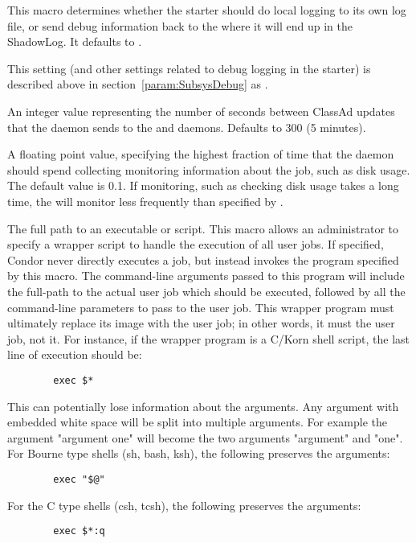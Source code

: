 \begin{description}
\label{param:StarterLocalLogging}
\item[\Macro{STARTER\_LOCAL\_LOGGING}]
  This macro determines whether the
  starter should do local logging to its own log file, or send debug
  information back to the  where it will end up in the
  ShadowLog.  It defaults to .

\label{param:StarterDebug}
\item[\Macro{STARTER\_DEBUG}]
  This setting (and other settings related to debug logging in the starter) is
  described above in section~\ref{param:SubsysDebug} as
  .

\label{param:StarterUpdateInterval}
\item[\Macro{STARTER\_UPDATE\_INTERVAL}]
  An integer value representing the number of seconds between 
  ClassAd updates that the  daemon sends to the 
   and  daemons. 
  Defaults to 300 (5 minutes).

\label{param:StarterUpdateIntervalTimeslice}
\item[\Macro{STARTER\_UPDATE\_INTERVAL\_TIMESLICE}]
  A floating point value, specifying the highest fraction of time that the 
   daemon should spend collecting
  monitoring information about the job, such as disk usage.
  The default  value is 0.1.  
  If monitoring, such as checking disk usage takes a long time,
  the  will monitor less frequently than specified by
  .

\label{param:UserJobWrapper} 
\item[\Macro{USER\_JOB\_WRAPPER}]
  The full path to an executable or script.
  This macro allows an administrator to specify a wrapper script to handle the
  execution of all user jobs.  
  If specified, Condor never directly executes a job, but instead
  invokes the program specified by this macro.
  The command-line arguments passed to this program will include the
  full-path to the actual user job which should be executed, followed by all
  the command-line parameters to pass to the user job.
  This wrapper program must ultimately replace its image with the user job;
  in other words,
  it must  the user job, not  it.
  For instance, if the wrapper program is a C/Korn shell script, the
  last line of execution should be:
\begin{verbatim}
        exec $*
\end{verbatim}
  This can potentially lose information about the arguments.
  Any argument with embedded white space will be split into multiple
  arguments.
  For example the argument "argument one" will become the two arguments
  "argument" and "one".
  For Bourne type shells (sh, bash, ksh),
  the following preserves the arguments:
\begin{verbatim}
        exec "$@"
\end{verbatim}
  For the C type shells (csh, tcsh), the following preserves the
  arguments:
\begin{verbatim}
        exec $*:q
\end{verbatim}



\end{description}
